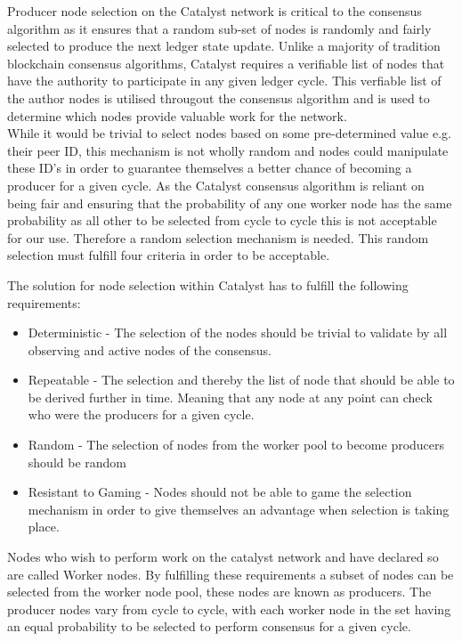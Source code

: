
Producer node selection on the Catalyst network is critical to the consensus algorithm as it ensures that a random sub-set of nodes is randomly and fairly selected to produce the next ledger state update. Unlike a majority of tradition blockchain consensus algorithms, Catalyst requires a verifiable list of nodes that have the authority to participate in any given ledger cycle. This verfiable list of the author nodes is utilised througout the consensus algorithm and is used to determine which nodes provide valuable work for the network.  \\

While it would be trivial to select nodes based on some pre-determined value e.g. their peer ID, this mechanism is not wholly random and nodes could manipulate these ID's in order to guarantee themselves a better chance of becoming a producer for a given cycle. As the Catalyst consensus algorithm is reliant on being fair and ensuring that the probability of any one worker node has the same probability as all other to be selected from cycle to cycle this is not acceptable for our use. Therefore a random selection mechanism is needed. This random selection must fulfill four criteria in order to be acceptable. 

The solution for node selection within Catalyst has to fulfill the following requirements: 

\begin{itemize} 
\item Deterministic - The selection of the nodes should be trivial to validate by all observing and active nodes of the consensus. 

\item Repeatable - The selection and thereby the list of node that should be able to be derived further in time. Meaning that any node at any point can check who were the producers for a given cycle. 

\item Random - The selection of nodes from the worker pool to become producers should be random 

\item Resistant to Gaming - Nodes should not be able to game the selection mechanism in order to give themselves an advantage when selection is taking place. 


\end{itemize}

Nodes who wish to perform work on the catalyst network and have declared so are called Worker nodes. By fulfilling these requirements a subset of nodes can be selected from the worker node pool, these nodes are known as producers. The producer nodes vary from cycle to cycle, with each worker node in the set having an equal probability to be selected to perform consensus for a given cycle. 

